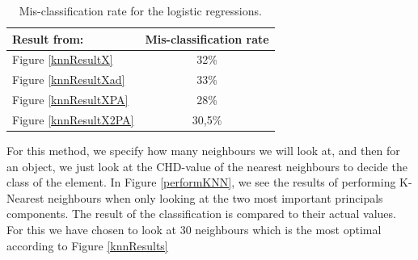 \begin{table}[H]
\begin{longtable}{lc} \hline
Result from: & Mis-classification rate \\ \hline
Figure \ref{knnResultX} & 32\% \\ 
Figure \ref{knnResultXad} & 33\% \\ 
Figure \ref{knnResultXPA} & 28\% \\ 
Figure \ref{knnResultX2PA} & 30,5\% \\ \hline
\end{longtable}
\caption{Mis-classification rate for the logistic regressions.}
\label{knnErrorRate}
\end{table}





For this method, we specify how many neighbours we will look at, and then for an object, we just look at the CHD-value of the nearest neighbours to decide the class of the element. In Figure \ref{performKNN}, we see the results of performing K-Nearest neighbours when only looking at the two most important principals components. The result of the classification is compared to their actual values. For this we have chosen to look at 30 neighbours which is the most optimal according to Figure \ref{knnResults}

